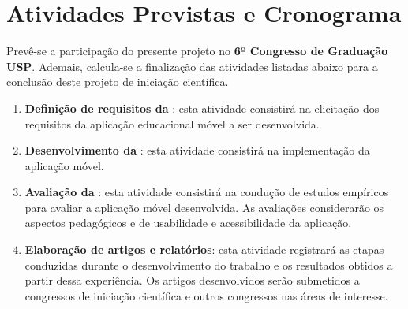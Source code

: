 \chapter{Atividades Previstas e Cronograma} \label{sec:atividades_futuras}
Prevê-se a participação do presente projeto no \textbf{6º Congresso de Graduação USP}. Ademais,
calcula-se a finalização das atividades listadas abaixo para a conclusão deste projeto de iniciação científica.

\begin{enumerate}
    \item \textbf{Definição de requisitos da \crossword}: esta atividade consistirá na elicitação dos requisitos da aplicação educacional móvel a ser desenvolvida.
    \item \textbf{Desenvolvimento da \crossword}: esta atividade consistirá na implementação da aplicação móvel.
    \item \textbf{Avaliação da \crossword}: esta atividade consistirá na condução de estudos empíricos para avaliar a aplicação móvel desenvolvida. As avaliações considerarão os aspectos pedagógicos e de usabilidade e acessibilidade da aplicação.
    \item \textbf{Elaboração de artigos e relatórios}: esta atividade registrará as etapas conduzidas durante o desenvolvimento do trabalho e os resultados obtidos a partir dessa experiência. Os artigos desenvolvidos serão submetidos a congressos de iniciação científica e outros congressos nas áreas de interesse.
\end{enumerate}

